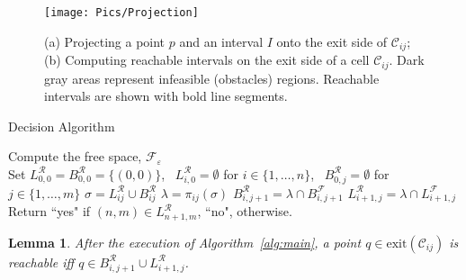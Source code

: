 \documentclass[12pt]{dalthesis}
\newtheorem{lemma}[theorem]{Lemma}
\newcommand{\set}[1]{{\{ #1 \}}}
\newcommand{\eps}{\varepsilon}
\newcommand{\CF}{{\mathscr F}}
\newcommand{\CR}{{\mathscr R}}
\newcommand{\CC}{{\mathscr C}}
\newcommand{\cell}[1]{{\CC_{#1}}}
\newcommand{\Feps}{\CF_\eps}
\newcommand{\LF}{L^\CF}
\newcommand{\BF}{B^\CF}
\newcommand{\LR}{L^\CR}
\newcommand{\BR}{B^\CR}
\newcommand{\exit}[1]{\mbox{exit}(\cell{#1})}
\newcommand{\proj}[1]{\pi_{#1}}
\begin{document}
\begin{figure}[t]
	\centering
	\texttt{[image: Pics/Projection]}
	\caption{ (a) Projecting a point $p$ and an interval $I$ onto the exit side of $\cell{ij}$;
	(b) Computing reachable intervals on the exit side of a cell $\cell{ij}$.
	Dark gray areas represent infeasible (obstacles) regions.
	Reachable intervals are shown with bold line segments.
	}
	\label{fig:project}
\end{figure}




\vspace{0.5em}
\begin{algorithm} [h]
\caption {\sc Decision Algorithm} \label{alg:main}
\begin{algorithmic}[1]
	\vspace{0.5em}
	\baselineskip

	\STATE Compute the free space, $\Feps$ \\
	\STATE Set $\LR_{0,0} = \BR_{0,0} = \set{(0,0)}$, \ 
		$\LR_{i,0} = \emptyset$ for $i \in \set{1, \ldots, n}$, \ 
		$\BR_{0,j} = \emptyset$ for $j \in \set{1, \ldots, m}$  
	\FOR {$i = 0$ to $n$} 
	 	\FOR {$j = 0$ to $m$}
			\STATE\label{lp:1} $\sigma = \LR_{ij} \cup \BR_{ij}$  
			\STATE\label{lp:2} $\lambda = \proj{ij}(\sigma)$  
			\STATE\label{lp:3} $\BR_{i,j+1} = \lambda \cap \BF_{i,j+1}$ 
			\STATE\label{lp:4} $\LR_{i+1,j} = \lambda \cap \LF_{i+1,j}$ 
		\ENDFOR
	\ENDFOR
	\STATE\label{line:last} Return 
``{\sc yes}" if $(n,m) \in \LR_{n+1,m}$, 
``{\sc no}", otherwise. 

\end{algorithmic}
\end{algorithm}
\vspace{0.5em}




\begin{lemma} \label{lemma:cell-process}
After the execution of Algorithm~\ref{alg:main}, 
	a point $q \in \exit{ij}$ is reachable 	
	iff $q \in \BR_{i,j+1} \cup  \LR_{i+1,j}$.
\end{lemma}
\end{document}
